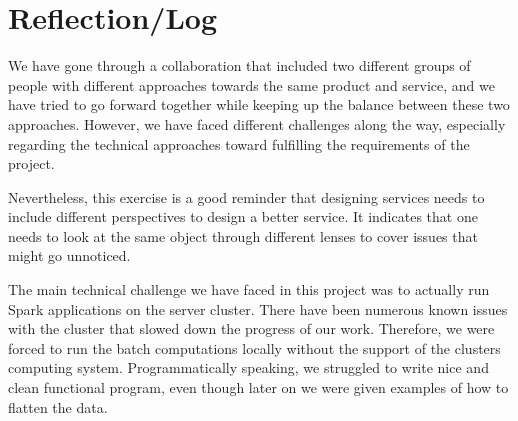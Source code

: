 \documentclass[format=acmsmall, review=false, screen=true]{acmart}
\begin{document}
\section{Reflection/Log}

We have gone through a collaboration that included two different groups of people with different approaches towards the same product and service, and we have tried to go forward together while keeping up the balance between these two approaches. However, we have faced different challenges along the way, especially regarding the technical approaches toward fulfilling the requirements of the project.

Nevertheless, this exercise is a good reminder that designing services needs to include different perspectives to design a better service. It indicates that one needs to look at the same object through different lenses to cover issues that might go unnoticed. 

The main technical challenge we have faced in this project was to actually run Spark applications on the server cluster. There have been numerous known issues with the cluster that slowed down the progress of our work. Therefore, we were forced to run the batch computations locally without the support of the clusters computing system. Programmatically speaking, we struggled to write nice and clean functional program, even though later on we were given examples of how to flatten the data.
\end{document}
